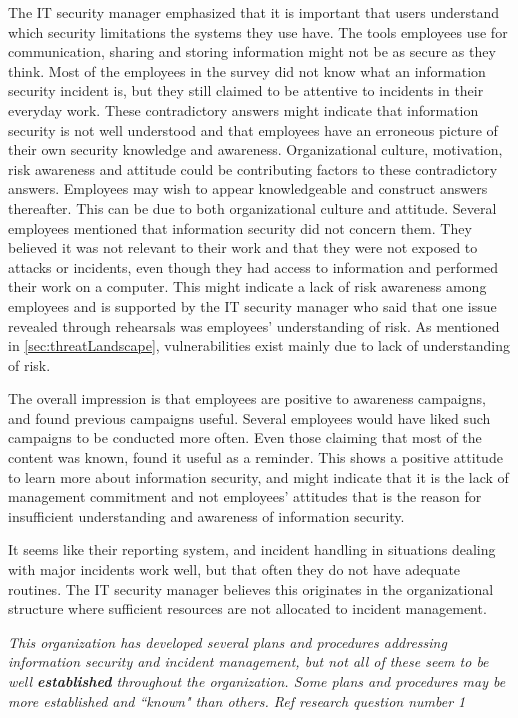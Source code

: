 The IT security manager emphasized that it is important that users understand which security limitations the systems they use have. The tools employees use for communication, sharing and storing information might not be as secure as they think. Most of the employees in the survey did not know what an information security incident is, but they still claimed to be attentive to incidents in their everyday work. These contradictory answers might indicate that information security is not well understood and that employees have an erroneous picture of their own security knowledge and awareness. Organizational culture, motivation, risk awareness and attitude could be contributing factors to these contradictory answers. Employees may wish to appear knowledgeable and construct answers thereafter. This can be due to both organizational culture and attitude. Several employees mentioned that information security did not concern them. They believed it was not relevant to their work and that they were not exposed to attacks or incidents, even though they had access to information and performed their work on a computer. This might indicate a lack of risk awareness among employees and is supported by the IT security manager who said that one issue revealed through rehearsals was employees' understanding of risk. As mentioned in \ref{sec:threatLandscape}, vulnerabilities exist mainly due to lack of understanding of risk.

The overall impression is that employees are positive to awareness campaigns, and found previous campaigns useful. Several employees would have liked such campaigns to be conducted more often. Even those claiming that most of the content was known, found it useful as a reminder. This shows a positive attitude to learn more about information security, and might indicate that it is the lack of management commitment and not employees' attitudes that is the reason for insufficient understanding and awareness of information security.

It seems like their reporting system, and incident handling in situations dealing with major incidents work well, but that often they do not have adequate routines. The IT security manager believes this originates in the organizational structure where sufficient resources are not allocated to incident management. 

\textit{This organization has developed several plans and procedures addressing information security and incident management, but not all of these seem to be well \textbf{established} throughout the organization. Some plans and procedures may be more established and ``known" than others. Ref research question number 1}


